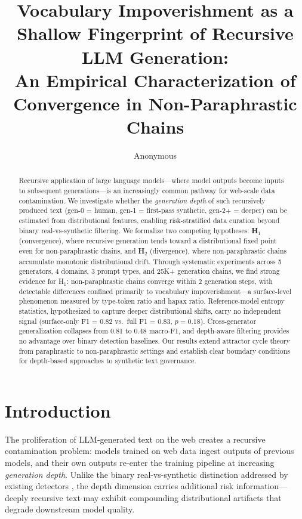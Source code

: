 \documentclass[letterpaper]{article}
\title{Vocabulary Impoverishment as a Shallow Fingerprint of Recursive LLM Generation:\\An Empirical Characterization of Convergence in Non-Paraphrastic Chains}
\author{Anonymous}
\date{}
\begin{document}
\maketitle

\begin{abstract}
Recursive application of large language models---where model outputs become inputs to subsequent generations---is an increasingly common pathway for web-scale data contamination. We investigate whether the \emph{generation depth} of such recursively produced text (gen-0 = human, gen-1 = first-pass synthetic, gen-2+ = deeper) can be estimated from distributional features, enabling risk-stratified data curation beyond binary real-vs-synthetic filtering. We formalize two competing hypotheses: \textbf{H$_1$} (convergence), where recursive generation tends toward a distributional fixed point even for non-paraphrastic chains, and \textbf{H$_2$} (divergence), where non-paraphrastic chains accumulate monotonic distributional drift. Through systematic experiments across 5 generators, 4 domains, 3 prompt types, and 25K+ generation chains, we find strong evidence for H$_1$: non-paraphrastic chains converge within 2 generation steps, with detectable differences confined primarily to vocabulary impoverishment---a surface-level phenomenon measured by type-token ratio and hapax ratio. Reference-model entropy statistics, hypothesized to capture deeper distributional shifts, carry no independent signal (surface-only F1 = 0.82 vs.\ full F1 = 0.83, $p = 0.18$). Cross-generator generalization collapses from 0.81 to 0.48 macro-F1, and depth-aware filtering provides no advantage over binary detection baselines. Our results extend attractor cycle theory from paraphrastic to non-paraphrastic settings and establish clear boundary conditions for depth-based approaches to synthetic text governance.
\end{abstract}

\section{Introduction}
\label{sec:intro}

The proliferation of LLM-generated text on the web creates a recursive contamination problem: models trained on web data ingest outputs of previous models, and their own outputs re-enter the training pipeline at increasing \emph{generation depth}. Unlike the binary real-vs-synthetic distinction addressed by existing detectors \citep{mitchell2023detectgpt,bao2024fastdetectgpt,tulchinskii2024ldscore}, the depth dimension carries additional risk information---deeply recursive text may exhibit compounding distributional artifacts that degrade downstream model quality.
\end{document}
